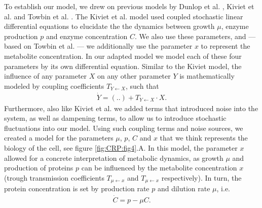 %
To establish our model, we drew on previous models by Dunlop et al. \cite{Dunlop2008}, Kiviet et al. \cite{Kiviet2014} and Towbin et al. \cite{Towbin2017}.
%
The Kiviet et al. model used coupled stochastic linear differential equations to elucidate the the dynamics between growth $\mu$, enzyme production $p$ and enzyme concentration $C$. %
%
We also use these parameters, and --- based on Towbin et al. --- we additionally use the parameter $x$ to represent the metabolite concentration. 
%
In our adapted model we 
model each of these four parameters by its own differential equation.
%
Similar to the Kiviet model, the influence of any parameter $X$ on any other parameter $Y$ is mathematically modeled by coupling coefficients $T_{{Y}\leftarrow{X}}$, such that 
\begin{align*}
	\dot{Y} = (..) + T_{{Y}\leftarrow{X}} \cdot X
	.
\end{align*}
%
Furthermore, also like Kiviet et al. we added terms that introduced noise into the system, as well as dampening terms, to allow us to introduce stochastic fluctuations into our model.
Using such coupling terms and noise sources, 
we created a model for the parameters $\mu$, $p$, $C$ and $x$ that we think represents the biology of the cell, 
see figure \ref{fig:CRP:fig4}.A.
%
In this model, the parameter $x$ allowed for a
concrete interpretation of metabolic dynamics,
as growth $\mu$ and production of proteins $p$ can be influenced by the metabolite concentration $x$ (trough transmission coefficients $T_{{\mu}\leftarrow{x}}$ and $T_{{\mu}\leftarrow{x}}$ respectively).
%
In turn, the protein concentration is set by production rate $p$ and dilution rate $\mu$, i.e. 
\begin{align*}
\dot{C} = p - \mu C
.
\end{align*}
